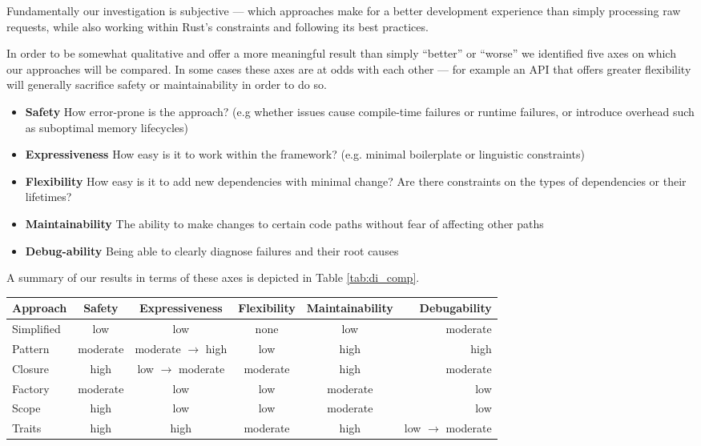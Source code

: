 \documentclass[sigconf]{acmart}
\begin{document}
Fundamentally our investigation is subjective --- which approaches make for a better development experience than simply processing raw requests, while also working within Rust's constraints and following its best practices.

In order to be somewhat qualitative and offer a more meaningful result than simply ``better'' or ``worse'' we identified five axes on which our approaches will be compared. In some cases these axes are at odds with each other --- for example an API that offers greater flexibility will generally sacrifice safety or maintainability in order to do so.

\begin{itemize}
\item \textbf{Safety} How error-prone is the approach? (e.g whether issues cause compile-time failures or runtime failures, or introduce overhead such as suboptimal memory lifecycles)
\item \textbf{Expressiveness} How easy is it to work within the framework? (e.g. minimal boilerplate or linguistic constraints)
\item \textbf{Flexibility} How easy is it to add new dependencies with minimal change? Are there constraints on the types of dependencies or their lifetimes?
\item \textbf{Maintainability} The ability to make changes to certain code paths without fear of affecting other paths
\item \textbf{Debug-ability} Being able to clearly diagnose failures and their root causes
\end{itemize}

A summary of our results in terms of these axes is depicted in Table \ref{tab:di_comp}.
 
\begin{table*}
  \caption{Qualitative comparison of differing mechanisms investigated}
  \label{tab:di_comp}
  \begin{tabular}{l*{4}{c}r}
    \toprule
    Approach & Safety & Expressiveness & Flexibility & Maintainability & Debugability \\
    \midrule
    Simplified & low & low & none & low & moderate\\
    Pattern & moderate & moderate $\rightarrow$ high & low & high & high\\
    Closure & high & low $\rightarrow$ moderate & moderate & high & moderate\\
    Factory & moderate & low & low & moderate & low\\
    Scope & high & low & low & moderate & low\\
    Traits & high & high & moderate & high & low $\rightarrow$ moderate\\
  \bottomrule
\end{tabular}
\end{table*}
\end{document}
